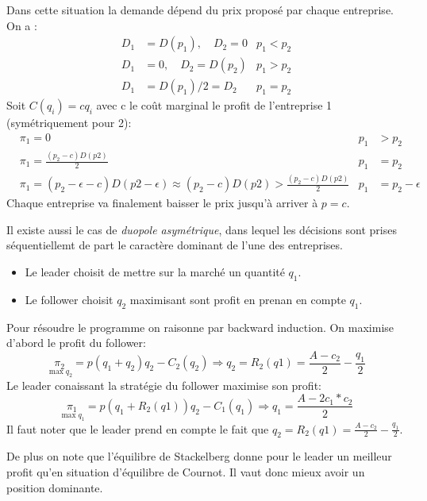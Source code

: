 \begin{tcolorbox}[title=Duopole de Bertrand]
	
	Dans cette situation la demande dépend du prix proposé par chaque entreprise. On a : 
	\begin{align*}
		D_1 &= D(p_1), \quad D_2=0  &p_1<p_2 \\
		D_1 &= 0, \quad D_2 = D(p_2)  &p_1>p_2 \\
		D_1 &= D(p_1)/2 = D_2 &p_1=p_2
	\end{align*}
	Soit $C(q_i)=cq_i$ avec c le coût marginal le profit de l'entreprise 1 (symétriquement pour 2):
	\begin{align*}
		&\pi_1=0  &p_1&>p_2 \\
		&\pi_1 = \frac{(p_2-c)D(p2)}{2} &p_1&=p_2 \\
		&\pi_1= (p_2-\epsilon-c)D(p2-\epsilon) \approx (p_2-c)D(p2)> \frac{(p_2-c)D(p2)}{2} &p_1&=p_2-\epsilon
	\end{align*}
	Chaque entreprise va finalement baisser le prix jusqu'à arriver à $p=c$.
	
\end{tcolorbox}

Il existe aussi le cas de \emph{duopole asymétrique}, dans lequel les décisions sont prises séquentiellemt de part le caractère dominant de l'une des entreprises.

\begin{tcolorbox}[title=Duopole de Stackelberg]
	
  \begin{itemize}[label=]
		\item Le leader choisit de mettre sur la marché un quantité $q_1$.
		\item Le follower choisit $q_2$ maximisant sont profit en prenan en compte $q_1$.
	\end{itemize}
	Pour résoudre le programme on raisonne par backward induction. On maximise d'abord le profit du follower:
	\[
		\underset{\max q_2}{\pi_2} = p(q_1+q_2)q_2-C_2(q_2) \Rightarrow q_2= R_2(q1)= \frac{A-c_2}{2}-\frac{q_1}{2}
	\]
	Le leader conaissant la stratégie du follower maximise son profit:
	\[
		\underset{\max q_1}{\pi_1} = p(q_1+R_2(q1))q_2-C_1(q_1) \Rightarrow q_1= \frac{A-2c_1*c_2}{2}
	\]
	Il faut noter que le leader prend en compte 
  le fait que $q_2= R_2(q1)= \frac{A-c_2}{2}-\frac{q_1}{2}$.
	
	De plus on note que l'équilibre de Stackelberg donne pour le 
  leader un meilleur profit qu'en situation d'équilibre de Cournot. 
  Il vaut donc mieux avoir un position dominante.
\end{tcolorbox}

